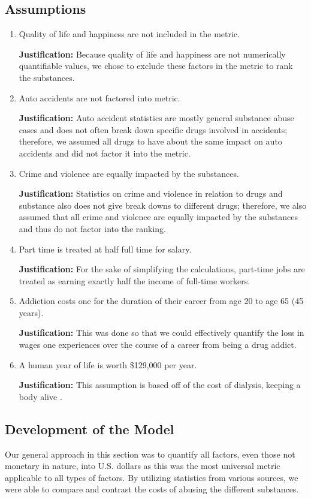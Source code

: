 \documentclass[12pt]{article}
\newcommand{\just}{\textbf{Justification: }}
\begin{document}
\subsection{Assumptions}
\begin{enumerate}
    \item Quality of life and happiness are not included in the metric.
    
    \just Because quality of life and happiness are not numerically quantifiable values, we chose to exclude these factors in the metric to rank the substances.
    
    \item Auto accidents are not factored into metric.
    
    \just Auto accident statistics are mostly general substance abuse cases and does not often break down specific drugs involved in accidents; therefore, we assumed all drugs to have about the same impact on auto accidents and did not factor it into the metric. 
    
    \item Crime and violence are equally impacted by the substances. 
    
    \just Statistics on crime and violence in relation to drugs and substance also does not give break downs to different drugs; therefore, we also assumed that all crime and violence are equally impacted by the substances and thus do not factor into the ranking.
    
    \item Part time is treated at half full time for salary. 
    
    \just For the sake of simplifying the calculations, part-time jobs are treated as earning exactly half the income of full-time workers. 
    
    \item Addiction costs one for the duration of their career from age 20 to age 65 (45 years).
    
    \just This was done so that we could effectively quantify the loss in wages one experiences over the course of a career from being a drug addict.
    
    \item A human year of life is worth \$129,000 per year. 

    \just This assumption is based off of the cost of dialysis, keeping a body alive \cite{dia}. 
\end{enumerate}
    
\subsection{Development of the Model}
Our general approach in this section was to quantify all factors, even those not monetary in nature, into U.S. dollars as this was the most universal metric applicable to all types of factors. By utilizing statistics from various sources, we were able to compare and contrast the costs of abusing the different substances. 
\end{document}
